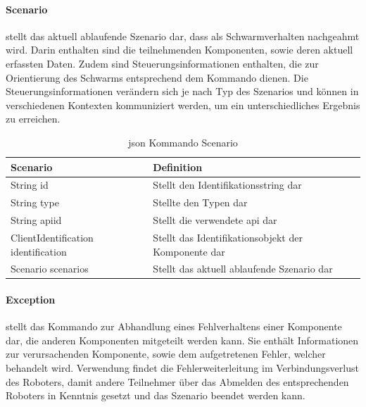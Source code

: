 \paragraph{Scenario} stellt das aktuell ablaufende Szenario dar, dass als Schwarmverhalten nachgeahmt wird. Darin enthalten sind die teilnehmenden Komponenten, sowie deren aktuell erfassten Daten. Zudem sind Steuerungsinformationen enthalten, die zur Orientierung des Schwarms entsprechend dem Kommando dienen. Die Steuerungsinformationen verändern sich je nach Typ des Szenarios und können in verschiedenen Kontexten kommuniziert werden, um ein unterschiedliches Ergebnis zu erreichen.\\

\begin{table}[h]
	\centering
	\begin{tabular}{|p{4cm}|p{8cm}|}
		\hline
		\textbf{Scenario} & Definition\\
		\hline
		String id & Stellt den Identifikationsstring dar \\
		String type & Stellte den Typen dar \\
		String apiid & Stellt die verwendete \gls{api} dar \\
		ClientIdentification identification & Stellt das Identifikationsobjekt der Komponente dar \\
		Scenario scenarios & Stellt das aktuell ablaufende Szenario dar \\
		\hline
	\end{tabular}
	\caption[\gls{json} Kommando Scenario]{\gls{json} Kommando Scenario}
	\label{tab:Szenario}
\end{table}

\paragraph{Exception} stellt das Kommando zur Abhandlung eines Fehlverhaltens einer Komponente dar, die anderen Komponenten mitgeteilt werden kann. Sie enthält Informationen zur verursachenden Komponente, sowie dem aufgetretenen Fehler, welcher behandelt wird. Verwendung findet die Fehlerweiterleitung im Verbindungsverlust des Roboters, damit andere Teilnehmer über das Abmelden des entsprechenden Roboters in Kenntnis gesetzt und das Szenario beendet werden kann.

